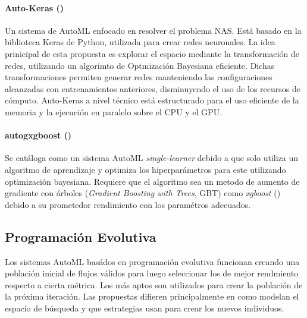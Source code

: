\paragraph*{Auto-Keras (\cite{jin2018efficient})} Un sistema de AutoML enfocado en resolver el problema NAS. Est\'a basado en la biblioteca Keras de Python, utilizada para crear redes neuronales.  La idea prinicipal de esta propuesta es explorar el espacio mediante la transformaci\'on de redes, utilizando un algorimto de Optmizaci\'on Bayesiana eficiente. Dichas transformaciones permiten generar redes manteniendo las configuraciones alcanzadas con entrenamientos anteriores, disminuyendo el uso de los recursos de c\'omputo. Auto-Keras a nivel t\'ecnico est\'a estructurado para el uso eficiente de la memoria y la ejecuci\'on en paralelo sobre el CPU y el GPU.

\paragraph*{autogxgboost (\cite{thomas2018automatic})} Se cat\'aloga como un sistema AutoML \textit {single-learner} debido a que solo utiliza un algoritmo de aprendizaje y optimiza los hiperpar\'ametros para este utilizando optimizaci\'on bayesiana. Requiere que el algoritmo sea un metodo de aumento de gradiente con \'arboles (\textit{Gradient Boosting with Trees}, GBT) como \textit {xgboost} (\cite{chen2016xgboost}) debido a su prometedor rendimiento con los param\'etros adecuados.   
    
\subsection{Programaci\'on Evolutiva}
     Los sistemas AutoML bas\'ados en programaci\'on evolutiva funcionan creando una poblaci\'on inicial de flujos v\'alidos para luego seleccionar los de mejor rendmiento respecto a cierta m\'etrica. Los m\'as aptos son utilizados para crear la poblaci\'on de la pr\'oxima iteraci\'on. Las propuestas difieren principalmente en como modelan el espacio de b\'usqueda y que estrategias usan para crear los nuevos individuos.
     
